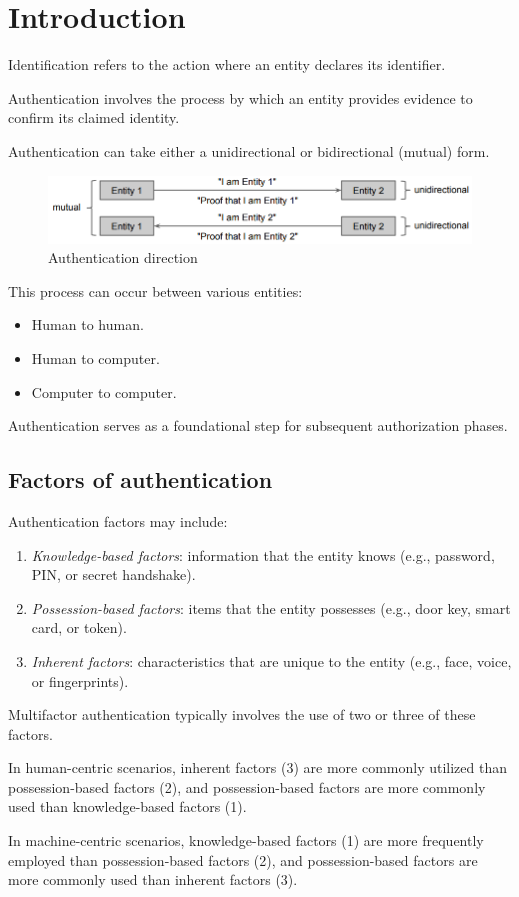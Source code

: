 \section{Introduction}

\begin{definition}
    Identification refers to the action where an entity declares its identifier.
\end{definition}
\begin{definition}
    Authentication involves the process by which an entity provides evidence to confirm its claimed identity.
\end{definition}
Authentication can take either a unidirectional or bidirectional (mutual) form.
\begin{figure}[H]
    \centering
    \includegraphics[width=0.75\linewidth]{images/auth.png}
    \caption{Authentication direction}
\end{figure}
This process can occur between various entities:
\begin{itemize}
    \item Human to human.
    \item Human to computer.
    \item Computer to computer.
\end{itemize}
Authentication serves as a foundational step for subsequent authorization phases.

\subsection{Factors of authentication}
Authentication factors may include:
\begin{enumerate}
    \item \textit{Knowledge-based factors}: information that the entity knows (e.g., password, PIN, or secret handshake).
    \item \textit{Possession-based factors}: items that the entity possesses (e.g., door key, smart card, or token).
    \item \textit{Inherent factors}: characteristics that are unique to the entity (e.g., face, voice, or fingerprints).
\end{enumerate}
Multifactor authentication typically involves the use of two or three of these factors.

In human-centric scenarios, inherent factors (3) are more commonly utilized than possession-based factors (2), and possession-based factors are more commonly used than knowledge-based factors (1).

In machine-centric scenarios, knowledge-based factors (1) are more frequently employed than possession-based factors (2), and possession-based factors are more commonly used than inherent factors (3).